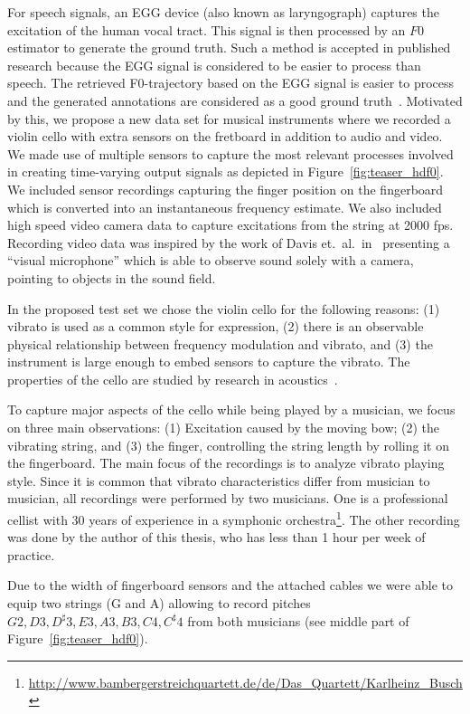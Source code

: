 For speech signals, an EGG device (also known as laryngograph) captures the excitation of the human vocal tract. 
This signal is then processed by an $F0$ estimator to generate the ground truth. 
Such a method is accepted in published research because the EGG signal is considered to be easier to process than speech. 
The retrieved F0-trajectory based on the EGG signal is easier to process and the generated annotations are considered as a good ground truth~\cite{pirker11, babacan13}.
Motivated by this, we propose a new data set for musical instruments where we recorded a violin cello with extra sensors on the fretboard in addition to audio and video.
We made use of multiple sensors to capture the most relevant processes involved in creating time-varying output signals as depicted in Figure~\ref{fig:teaser_hdf0}.
We included sensor recordings capturing the finger position on the fingerboard which is converted into an instantaneous frequency estimate.
We also included high speed video camera data to capture excitations from the string at 2000 fps.
Recording video data was inspired by the work of Davis et.\ al.\ in~\cite{Davis2014VisualMic} presenting a ``visual microphone'' which is able to observe sound solely with a camera, pointing to objects in the sound field. 
\par
In the proposed test set we chose the violin cello for the following reasons: (1) vibrato is used as a common style for expression, (2) there is an observable physical relationship between frequency modulation and vibrato, and (3) the instrument is large enough to embed sensors to capture the vibrato. The properties of the cello are studied by research in acoustics~\cite{woodhouse04, woodhouse99}.
\par
To capture major aspects of the cello while being played by a musician, we focus on three main observations: (1) Excitation caused by the moving bow; (2) the vibrating string, and (3) the finger, controlling the string length by rolling it on the fingerboard.
The main focus of the recordings is to analyze vibrato playing style. Since it is common that vibrato characteristics differ from musician to musician, all recordings were performed by two musicians. One is a professional cellist with 30 years of experience in a symphonic orchestra\footnote{\url{http://www.bambergerstreichquartett.de/de/Das_Quartett/Karlheinz_Busch}}.
The other recording was done by the author of this thesis, who has less than 1 hour per week of practice.
\par
Due to the width of fingerboard sensors and the attached cables we were able to equip two strings (G and A) allowing to record pitches ${G2, D3, D^\sharp3, E3, A3, B3, C4, C^\sharp4}$ from both musicians (see middle part of Figure~\ref{fig:teaser_hdf0}).
